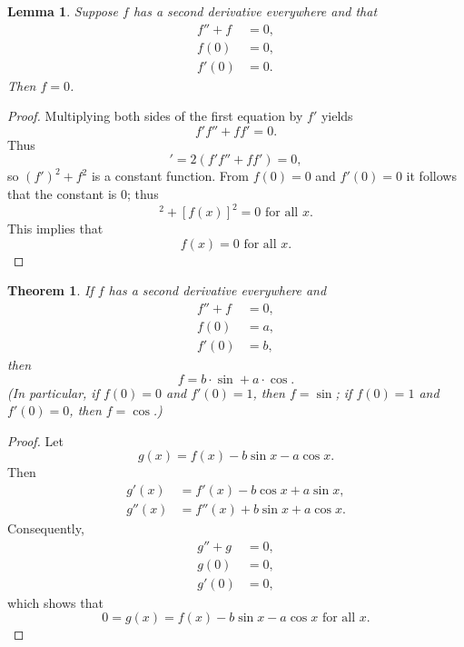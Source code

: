 \documentclass{article}
\newtheorem*{lemma*}{Lemma}
\newtheorem{theorem}{Theorem}
\begin{document}
\begin{lemma*}
  Suppose $f$ has a second derivative everywhere and that \begin{align*}
    f'' + f &= 0, \\
    f(0) &= 0, \\
    f'(0) &= 0.
  \end{align*} Then $f = 0$.
\end{lemma*}

\begin{proof}
  Multiplying both sides of the first equation by $f'$ yields \begin{equation*}
    f'f'' + ff' = 0.
  \end{equation*} Thus \begin{equation*}
    [(f')^2 + f^2]' = 2(f'f'' + ff') = 0,
  \end{equation*} so $(f')^2 + f^2$ is a constant function. From $f(0) = 0$ and
  $f'(0) = 0$ it follows that the constant is 0; thus \begin{equation*}
    [f'(x)]^2 + [f(x)]^2 = 0 \text{ for all } x.
  \end{equation*} This implies that \begin{equation*}
    f(x) = 0 \text{ for all } x.
  \end{equation*}
\end{proof}

\begin{theorem}
  If $f$ has a second derivative everywhere and \begin{align*}
    f'' + f &= 0, \\
    f(0) &= a, \\
    f'(0) &= b,
  \end{align*} then \begin{equation*}
    f = b \cdot \sin{} + a \cdot \cos{}.
  \end{equation*} (In particular, if $f(0) = 0$ and $f'(0) = 1$, then $f =
  \sin$; if $f(0) = 1$ and $f'(0) = 0$, then $f = \cos$.)
\end{theorem}

\begin{proof}
  Let \begin{equation*}
    g(x) = f(x) - b\sin x - a\cos x.
  \end{equation*} Then \begin{align*}
    g'(x) &= f'(x) - b\cos x + a\sin x, \\
    g''(x) &= f''(x) + b\sin x + a\cos x.
  \end{align*} Consequently, \begin{align*}
    g'' + g &= 0, \\
    g(0) &= 0, \\
    g'(0) &= 0,
  \end{align*} which shows that \begin{equation*}
    0 = g(x) = f(x) - b\sin x - a\cos x \text{ for all } x.
  \end{equation*}
\end{proof}
\end{document}
